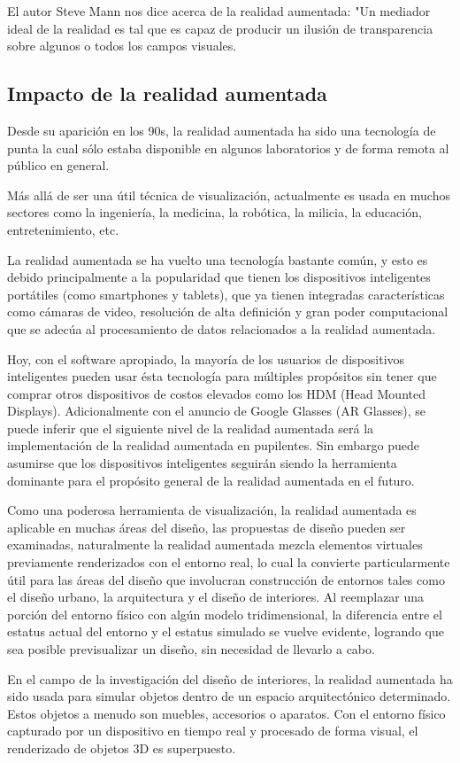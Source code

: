 El autor Steve Mann nos dice acerca de la realidad aumentada: "Un mediador ideal de la realidad es tal que es capaz de producir un ilusión de transparencia sobre algunos o todos los campos visuales\cite{B22}. \par
\subsection{Impacto de la realidad aumentada}
Desde su aparición en los 90s, la realidad aumentada ha sido una tecnología de punta la cual sólo estaba disponible en algunos laboratorios y de forma remota al público en general. \par
Más allá de ser una útil técnica de visualización, actualmente es usada en muchos sectores como la ingeniería, la medicina, la robótica, la milicia, la educación, entretenimiento, etc.\par
La realidad aumentada se ha vuelto una tecnología bastante común, y esto es debido principalmente a la popularidad que tienen los dispositivos inteligentes portátiles (como smartphones y tablets), que ya tienen integradas características como cámaras de video, resolución de alta definición y gran poder computacional que se adecúa al procesamiento de datos relacionados a la realidad aumentada.\par
Hoy, con el software apropiado, la mayoría de los usuarios de dispositivos inteligentes pueden usar ésta tecnología para múltiples propósitos sin tener que comprar otros dispositivos de costos elevados como los HDM (Head Mounted Displays). Adicionalmente con el anuncio de Google Glasses (AR Glasses), se puede inferir que el siguiente nivel de la realidad aumentada será la implementación de la realidad aumentada en pupilentes. Sin embargo puede asumirse que los dispositivos inteligentes seguirán siendo la herramienta dominante para el propósito general de la realidad aumentada en el futuro.\par
Como una poderosa herramienta de visualización, la realidad aumentada es aplicable en muchas áreas del diseño, las propuestas de diseño pueden ser examinadas, naturalmente la realidad aumentada mezcla elementos virtuales previamente renderizados con el entorno real, lo cual la convierte particularmente útil para las áreas del diseño que involucran construcción de entornos tales como el diseño urbano, la arquitectura y el diseño de interiores. Al reemplazar una porción del entorno físico con algún modelo tridimensional, la diferencia entre el estatus actual del entorno y el estatus simulado se vuelve evidente, logrando que sea posible previsualizar un diseño, sin necesidad de llevarlo a cabo.\par
En el campo de la investigación del diseño de interiores, la realidad aumentada ha sido usada para simular objetos dentro de un espacio arquitectónico determinado. Estos objetos a menudo son muebles, accesorios o aparatos. Con el entorno físico capturado por un dispositivo en tiempo real y procesado de forma visual, el renderizado de objetos 3D es superpuesto.

